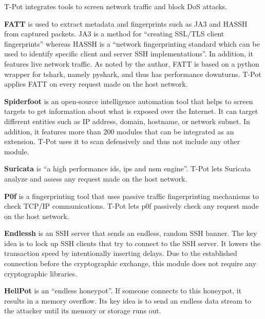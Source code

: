 T-Pot integrates tools to screen network traffic and block DoS attacks.

\textbf{FATT} \cite{fatt2021} is used to extract metadata and fingerprints such as JA3 \cite{ja32021} and HASSH \cite{hassh2021} from captured packets.
JA3 is a method for \enquote{creating SSL/TLS client fingerprints} whereas HASSH is a \enquote{network fingerprinting standard which can be used to identify specific client and server SSH implementations}.
In addition, it features live network traffic.
As noted by the author, FATT is based on a python wrapper for tshark, namely pyshark, and thus has performance downturns.
T-Pot applies FATT on every request made on the host network.

\textbf{Spiderfoot} \cite{spiderfoot2021} is an open-source intelligence automation tool that helps to screen targets to get information about what is exposed over the Internet.
It can target different entities such as IP address, domain, hostname, or network subnet.
In addition, it features more than 200 modules that can be integrated as an extension.
T-Pot uses it to scan defensively and thus not include any other module.

\textbf{Suricata} \cite{suricata2021} is \enquote{a high performance \ac{ids}, \ac{ips} and \ac{nsm} engine}.
T-Pot lets Suricata analyze and assess any request made on the host network.

\textbf{P0f} \cite{p0f2021} is a fingerprinting tool that uses passive traffic fingerprinting mechanisms to check TCP/IP communications.
T-Pot lets p0f passively check any request made on the host network.

\textbf{Endlessh} \cite{endlessh2021} is an SSH server that sends an endless, random SSH banner.
The key idea is to lock up SSH clients that try to connect to the SSH server.
It lowers the transaction speed by intentionally inserting delays.
Due to the established connection before the cryptographic exchange, this module does not require any cryptographic libraries.

\textbf{HellPot} \cite{hellpot2021} is an \enquote{endless honeypot}.
If someone connects to this honeypot, it results in a memory overflow.
Its key idea is to send an endless data stream to the attacker until its memory or storage runs out.

